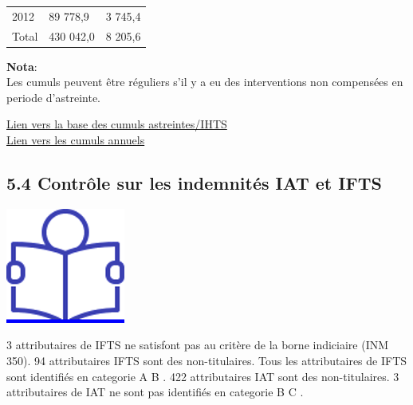 \begin{longtable}[]{@{}lll@{}}
\begin{minipage}[t]{0.07\columnwidth}\raggedright
2012\strut
\end{minipage} & \begin{minipage}[t]{0.55\columnwidth}\raggedright
89 778,9\strut
\end{minipage} & \begin{minipage}[t]{0.29\columnwidth}\raggedright
3 745,4\strut
\end{minipage}\tabularnewline
\begin{minipage}[t]{0.07\columnwidth}\raggedright
Total\strut
\end{minipage} & \begin{minipage}[t]{0.55\columnwidth}\raggedright
430 042,0\strut
\end{minipage} & \begin{minipage}[t]{0.29\columnwidth}\raggedright
8 205,6\strut
\end{minipage}\tabularnewline
\bottomrule
\end{longtable}

\textbf{Nota}:\\
Les cumuls peuvent être réguliers s'il y a eu des interventions non
compensées en periode d'astreinte.

\href{../Bases/Reglementation/Controle_astreintes_HS_irreg.csv}{Lien vers
la base des cumuls astreintes/IHTS}\\
\href{../Bases/Reglementation/Cum_astreintes_HS_irreg.csv}{Lien vers les
cumuls annuels}

\hypertarget{controle-sur-les-indemnites-iat-et-ifts}{%
\subsection{5.4 Contrôle sur les indemnités IAT et
IFTS}\label{controle-sur-les-indemnites-iat-et-ifts}}

\href{../Docs/Notices/fiche_IAT_IFTS.odt}{\includegraphics{icones/Notice.png}}

3 attributaires de IFTS ne satisfont pas au critère de la borne
indiciaire (INM 350). 94 attributaires IFTS sont des non-titulaires.
Tous les attributaires de IFTS sont identifiés en categorie A B . 422
attributaires IAT sont des non-titulaires. 3 attributaires de IAT ne
sont pas identifiés en categorie B C .

